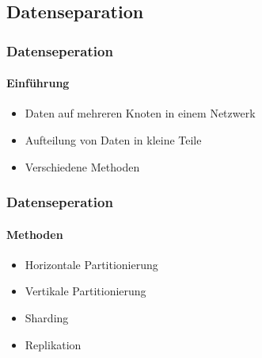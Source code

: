 \subsection{Datenseparation}
\begin{frame}
  \frametitle{Datenseperation}
  \framesubtitle{Einführung}
  \begin{itemize}
    \item Daten auf mehreren Knoten in einem Netzwerk
    \item Aufteilung von Daten in kleine Teile
    \item Verschiedene Methoden
  \end{itemize}
\end{frame}

\begin{frame}
  \frametitle{Datenseperation}
  \framesubtitle{Methoden}
  \begin{itemize}
    \item Horizontale Partitionierung
    \item Vertikale Partitionierung
    \item Sharding
    \item Replikation
  \end{itemize}
\end{frame}